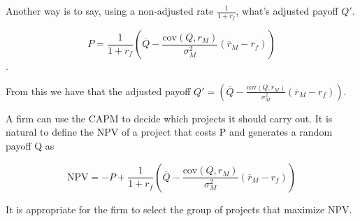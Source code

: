 Another way is to say, using a non-adjusted rate $\frac{1}{1+r_f}$, 
what's adjusted payoff $Q'$. 

$$P = \frac{1}{1+r_f}\left(\overline{Q} - \frac{\text{cov}(Q,r_M)}{\sigma^{2}_{M}}(\overline{r}_M - r_f) \right)$$.

From this we have that the adjusted payoff 
$Q' = \left(\overline{Q} - \frac{\text{cov}(Q,r_M)}{\sigma^{2}_{M}}(\overline{r}_M - r_f) \right)$.


A ﬁrm can use the CAPM to decide which projects it
should carry out.
It is natural to deﬁne the NPV of a project that costs P
and generates a random payoff Q as

$$\text{NPV} = -P + \frac{1}{1+r_f}\left(\overline{Q} - \frac{\text{cov}(Q,r_M)}{\sigma^{2}_{M}}(\overline{r}_M - r_f) \right)$$

It is appropriate for the ﬁrm to select the group of
projects that maximize NPV.